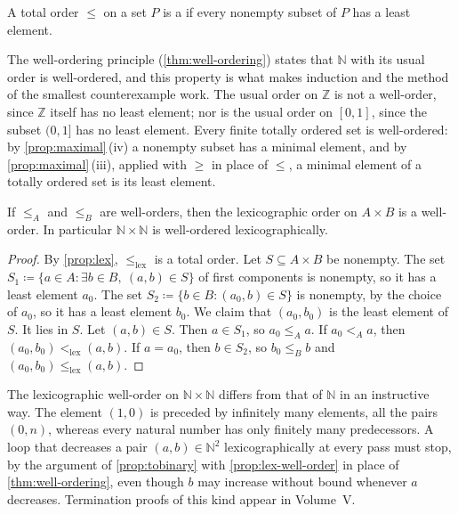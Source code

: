 \begin{definition}
\label{def:well-order}
A total order $\le$ on a set $P$ is a  if every nonempty subset of $P$ has a least element.
\end{definition}

The well-ordering principle (\cref{thm:well-ordering}) states that $\mathbb N$ with its usual order is well-ordered, and this property is what makes induction and the method of the smallest counterexample work. The usual order on $\mathbb Z$ is not a well-order, since $\mathbb Z$ itself has no least element; nor is the usual order on $[0,1]$, since the subset $(0,1]$ has no least element. Every finite totally ordered set is well-ordered: by \cref{prop:maximal}\,(iv) a nonempty subset has a minimal element, and by \cref{prop:maximal}\,(iii), applied with $\ge$ in place of $\le$, a minimal element of a totally ordered set is its least element.

\begin{proposition}
\label{prop:lex-well-order}
If $\le_A$ and $\le_B$ are well-orders, then the lexicographic order on $A\times B$ is a well-order. In particular $\mathbb N\times\mathbb N$ is well-ordered lexicographically.
\end{proposition}

\begin{proof}
By \cref{prop:lex}, $\le_{\mathrm{lex}}$ is a total order. Let $S\subseteq A\times B$ be nonempty. The set $S_1\coloneqq\{a\in A:\exists b\in B,\ (a,b)\in S\}$ of first components is nonempty, so it has a least element $a_0$. The set $S_2\coloneqq\{b\in B: (a_0,b)\in S\}$ is nonempty, by the choice of $a_0$, so it has a least element $b_0$. We claim that $(a_0,b_0)$ is the least element of $S$. It lies in $S$. Let $(a,b)\in S$. Then $a\in S_1$, so $a_0\le_Aa$. If $a_0<_Aa$, then $(a_0,b_0)<_{\mathrm{lex}}(a,b)$. If $a=a_0$, then $b\in S_2$, so $b_0\le_Bb$ and $(a_0,b_0)\le_{\mathrm{lex}}(a,b)$.
\end{proof}

The lexicographic well-order on $\mathbb N\times\mathbb N$ differs from that of $\mathbb N$ in an instructive way. The element $(1,0)$ is preceded by infinitely many elements, all the pairs $(0,n)$, whereas every natural number has only finitely many predecessors. A loop that decreases a pair $(a,b)\in\mathbb N^2$ lexicographically at every pass must stop, by the argument of \cref{prop:tobinary} with \cref{prop:lex-well-order} in place of \cref{thm:well-ordering}, even though $b$ may increase without bound whenever $a$ decreases. Termination proofs of this kind appear in Volume~V.

